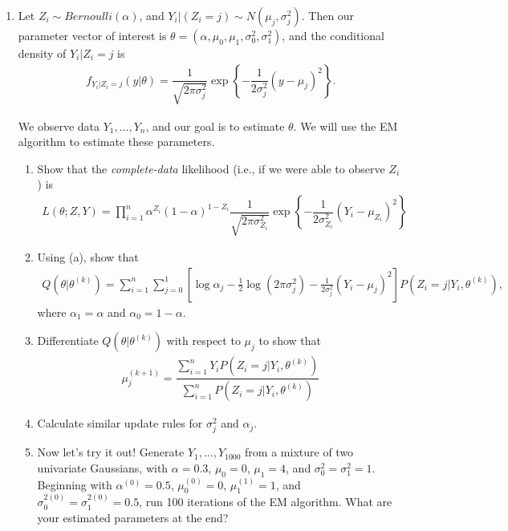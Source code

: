 \documentclass[11pt]{article}
\begin{document}
\begin{enumerate}
\item Let $Z_i \sim Bernoulli(\alpha)$, and $Y_i | (Z_i = j) \sim N(\mu_j, \sigma_j^2)$. Then our parameter vector of interest is $\theta = (\alpha, \mu_0, \mu_1, \sigma_0^2, \sigma_1^2)$, and the conditional density of $Y_i|Z_i = j$ is
\begin{align*}
f_{Y_i|Z_i = j}(y | \theta) = \dfrac{1}{\sqrt{2 \pi \sigma_j^2}} \exp \left\lbrace - \dfrac{1}{2\sigma_j^2} (y - \mu_j)^2 \right\rbrace.
\end{align*}

We observe data $Y_1,...,Y_n$, and our goal is to estimate $\theta$. We will use the EM algorithm to estimate these parameters.

\begin{enumerate}
\item Show that the \textit{complete-data} likelihood (i.e., if we were able to observe $Z_i$) is
\begin{align*}
L(\theta; Z, Y) = \prod \limits_{i=1}^n \alpha^{Z_i}(1 - \alpha)^{1 - Z_i} \dfrac{1}{\sqrt{2 \pi \sigma_{Z_i}^2}} \exp \left\lbrace - \dfrac{1}{2\sigma_{Z_i}^2} (Y_i - \mu_{Z_i})^2 \right\rbrace
\end{align*}

\item Using (a), show that
\begin{align*}
Q(\theta | \theta^{(k)}) = \sum \limits_{i=1}^n \sum \limits_{j=0}^1 [\log \alpha_j - \frac{1}{2} \log(2 \pi \sigma_j^2) - \frac{1}{2 \sigma_j^2}(Y_i - \mu_j)^2]P(Z_i = j | Y_i, \theta^{(k)}),
\end{align*}
where $\alpha_1 = \alpha$ and $\alpha_0 = 1 - \alpha$.

\item Differentiate $Q(\theta | \theta^{(k)})$ with respect to $\mu_j$ to show that 
\begin{align*}
\mu_j^{(k+1)} = \dfrac{\sum \limits_{i=1}^n Y_i P(Z_i = j | Y_i, \theta^{(k)})}{\sum \limits_{i=1}^n P(Z_i = j | Y_i, \theta^{(k)})}
\end{align*}

\item Calculate similar update rules for $\sigma_j^2$ and $\alpha_j$.

\item Now let's try it out! Generate $Y_1,...,Y_{1000}$ from a mixture of two univariate Gaussians, with $\alpha = 0.3$, $\mu_0 = 0$, $\mu_1 = 4$, and $\sigma_0^2 = \sigma_1^2 = 1$. Beginning with $\alpha^{(0)} = 0.5$, $\mu_0^{(0)} = 0$, $\mu_1^{(1)} = 1$, and $\sigma_0^{2(0)} = \sigma_1^{2(0)} = 0.5$, run 100 iterations of the EM algorithm. What are your estimated parameters at the end?
\end{enumerate}
\end{enumerate}
\end{document}
